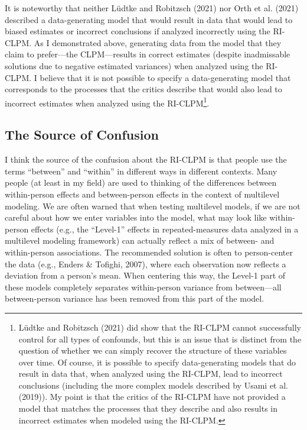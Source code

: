 \documentclass[
  english,
  man,floatsintext]{apa6}
\begin{document}
It is noteworthy that neither Lüdtke and Robitzsch (2021) nor Orth et al. (2021) described a data-generating model that would result in data that would lead to biased estimates or incorrect conclusions if analyzed incorrectly using the RI-CLPM. As I demonstrated above, generating data from the model that they claim to prefer---the CLPM---results in correct estimates (despite inadmissable solutions due to negative estimated variances) when analyzed using the RI-CLPM. I believe that it is not possible to specify a data-generating model that corresponds to the processes that the critics describe that would also lead to incorrect estimates when analyzed using the RI-CLPM\footnote{Lüdtke and Robitzsch (2021) did show that the RI-CLPM cannot successfully control for all types of confounds, but this is an issue that is distinct from the question of whether we can simply recover the structure of these variables over time. Of course, it is possible to specify data-generating models that do result in data that, when analyzed using the RI-CLPM, lead to incorrect conclusions (including the more complex models described by Usami et al. (2019)). My point is that the critics of the RI-CLPM have not provided a model that matches the processes that they describe and also results in incorrect estimates when modeled using the RI-CLPM.}.

\hypertarget{the-source-of-confusion}{%
\subsection{The Source of Confusion}\label{the-source-of-confusion}}

I think the source of the confusion about the RI-CLPM is that people use the terms ``between'' and ``within'' in different ways in different contexts. Many people (at least in my field) are used to thinking of the differences between within-person effects and between-person effects in the context of multilevel modeling. We are often warned that when testing multilevel models, if we are not careful about how we enter variables into the model, what may look like within-person effects (e.g., the ``Level-1'' effects in repeated-measures data analyzed in a multilevel modeling framework) can actually reflect a mix of between- and within-person associations. The recommended solution is often to person-center the data (e.g., Enders \& Tofighi, 2007), where each observation now reflects a deviation from a person's mean. When centering this way, the Level-1 part of these models completely separates within-person variance from between---all between-person variance has been removed from this part of the model.
\end{document}
